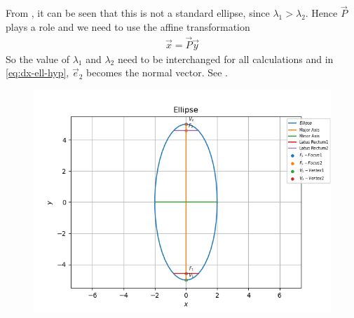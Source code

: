 From , it can be seen that this is not a standard ellipse, since $\lambda_1 > \lambda_2$.  Hence $\vec{P}$ plays a role and we need to use the affine transformation
\begin{align}
\vec{x} = \vec{P}\vec{y}
\end{align}
So the value of $\lambda_1$ and $\lambda_2$ need to be interchanged for all calculations and 
in
					\eqref{eq:dx-ell-hyp},
					$\vec{e}_2$ becomes the normal vector.
See .
\begin{figure}[!h]
	\begin{center} 
	    \includegraphics[width=\columnwidth]{chapters/11/11/3/2/figs/ellipse}
	\end{center}
\caption{}
\label{fig:chapters/11/11/3/2/Fig1}
\end{figure}
